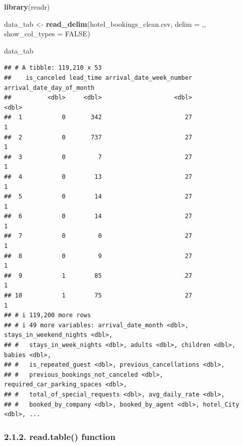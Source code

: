 \documentclass[
]{article}
\newenvironment{Shaded}{\begin{snugshade}}{\end{snugshade}}
\newcommand{\AttributeTok}[1]{\textcolor[rgb]{0.13,0.29,0.53}{#1}}
\newcommand{\ConstantTok}[1]{\textcolor[rgb]{0.56,0.35,0.01}{#1}}
\newcommand{\FunctionTok}[1]{\textcolor[rgb]{0.13,0.29,0.53}{\textbf{#1}}}
\newcommand{\NormalTok}[1]{#1}
\newcommand{\OtherTok}[1]{\textcolor[rgb]{0.56,0.35,0.01}{#1}}
\newcommand{\StringTok}[1]{\textcolor[rgb]{0.31,0.60,0.02}{#1}}
\begin{document}
\begin{Shaded}
\begin{Highlighting}[]
\FunctionTok{library}\NormalTok{(readr)}

\NormalTok{data\_tab }\OtherTok{\textless{}{-}} \FunctionTok{read\_delim}\NormalTok{(}\StringTok{\textquotesingle{}hotel\_bookings\_clean.csv\textquotesingle{}}\NormalTok{, }\AttributeTok{delim =} \StringTok{\textquotesingle{},\textquotesingle{}}\NormalTok{, }\AttributeTok{show\_col\_types =} \ConstantTok{FALSE}\NormalTok{)}

\NormalTok{data\_tab}
\end{Highlighting}
\end{Shaded}

\begin{verbatim}
## # A tibble: 119,210 x 53
##    is_canceled lead_time arrival_date_week_number arrival_date_day_of_month
##          <dbl>     <dbl>                    <dbl>                     <dbl>
##  1           0       342                       27                         1
##  2           0       737                       27                         1
##  3           0         7                       27                         1
##  4           0        13                       27                         1
##  5           0        14                       27                         1
##  6           0        14                       27                         1
##  7           0         0                       27                         1
##  8           0         9                       27                         1
##  9           1        85                       27                         1
## 10           1        75                       27                         1
## # i 119,200 more rows
## # i 49 more variables: arrival_date_month <dbl>, stays_in_weekend_nights <dbl>,
## #   stays_in_week_nights <dbl>, adults <dbl>, children <dbl>, babies <dbl>,
## #   is_repeated_guest <dbl>, previous_cancellations <dbl>,
## #   previous_bookings_not_canceled <dbl>, required_car_parking_spaces <dbl>,
## #   total_of_special_requests <dbl>, avg_daily_rate <dbl>,
## #   booked_by_company <dbl>, booked_by_agent <dbl>, hotel_City <dbl>, ...
\end{verbatim}

\hypertarget{read.table-function}{%
\subsubsection{2.1.2. read.table() function}\label{read.table-function}}
\end{document}
